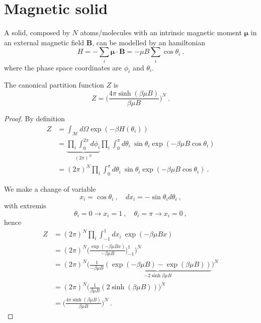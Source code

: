 \section{Magnetic solid}

    A solid, composed by $N$ atoms/molecules with an intrinsic magnetic moment $\boldsymbol \mu$ in an external magnetic field $\mathbf B$, can be modelled by an hamiltonian 
    \begin{equation*}
        H = - \sum_i \boldsymbol \mu \cdot \mathbf B = - \mu B \sum_i \cos \theta_i ~.
    \end{equation*}
    where the phase space coordinates are $\phi_i$ and $\theta_i$.

    The canonical partition function $Z$ is 
    \begin{equation*}
        Z = \Big (\frac{4 \pi \sinh (\beta \mu B)}{\beta \mu B} \Big )^N ~.
    \end{equation*}
    \begin{proof}
        By definition
        \begin{equation*}
        \begin{aligned}
            Z & = \int_{\mathcal M} d \Omega \exp(- \beta H (\theta_i)) \\ & = \underbrace{\prod_i \int_0^{2\pi} d\phi_i}_{(2\pi)^N} \prod_i \int_0^\pi d\theta_i ~ \sin \theta_i \exp(- \beta \mu B \cos \theta_i) \\ & = (2\pi)^N \prod_i \int_0^\pi d\theta_i ~ \sin \theta_i \exp(- \beta \mu B \cos \theta_i)  ~.
        \end{aligned}
        \end{equation*}
        

        We make a change of variable 
        \begin{equation*}
            x_i  = \cos \theta_i ~, \quad d x_i = - \sin \theta_i d\theta_i ~,
        \end{equation*}
        with extremis 
        \begin{equation*}
            \theta_i = 0 \rightarrow x_i = 1 ~, \quad \theta_i = \pi \rightarrow x_i = 0 ~,
        \end{equation*}
        hence
        \begin{equation*}
        \begin{aligned}
            Z & = (2\pi)^N \prod_i \int_{-1}^1 dx_i ~ \exp(- \beta \mu B x) \\ & = (2\pi)^N \Big ( \frac{\exp(- \beta \mu B x)}{- \beta \mu B} \Big \vert_{-1}^{1} \Big )^N \\ & = (2\pi)^N \Big ( \frac{1}{- \beta \mu B} \underbrace{(\exp(- \beta \mu B) - \exp(\beta \mu B))}_{- 2 \sinh \beta \mu B}\Big )^N \\ & = (2\pi)^N \Big ( \frac{1}{\beta \mu B} (2 \sinh (\beta \mu B)) \Big )^N \\ & = \Big (\frac{4 \pi \sinh (\beta \mu B)}{\beta \mu B} \Big )^N ~.
        \end{aligned}
        \end{equation*}
    \end{proof}


